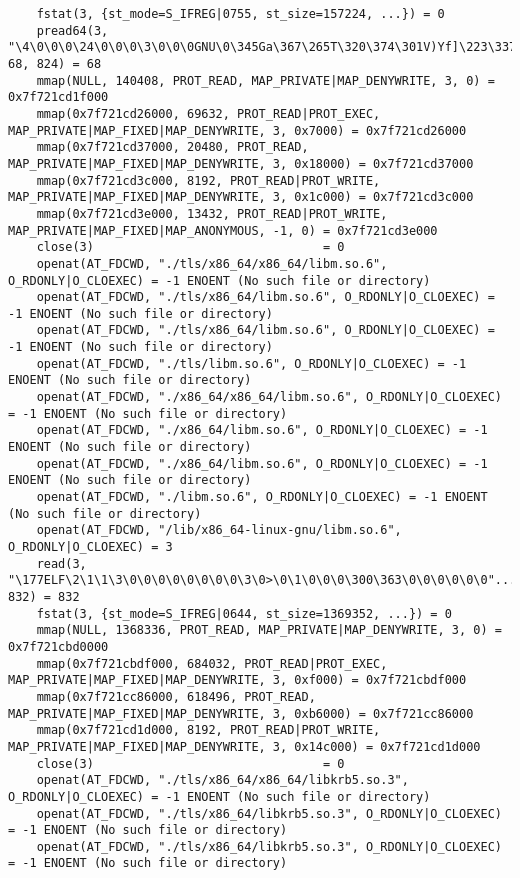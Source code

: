 \documentclass[pdf, unicode, 12pt, a4paper,oneside,fleqn]{article}
\begin{document}
{\begin{verbatim}
    fstat(3, {st_mode=S_IFREG|0755, st_size=157224, ...}) = 0
    pread64(3, "\4\0\0\0\24\0\0\0\3\0\0\0GNU\0\345Ga\367\265T\320\374\301V)Yf]\223\337"..., 68, 824) = 68
    mmap(NULL, 140408, PROT_READ, MAP_PRIVATE|MAP_DENYWRITE, 3, 0) = 0x7f721cd1f000
    mmap(0x7f721cd26000, 69632, PROT_READ|PROT_EXEC, MAP_PRIVATE|MAP_FIXED|MAP_DENYWRITE, 3, 0x7000) = 0x7f721cd26000
    mmap(0x7f721cd37000, 20480, PROT_READ, MAP_PRIVATE|MAP_FIXED|MAP_DENYWRITE, 3, 0x18000) = 0x7f721cd37000
    mmap(0x7f721cd3c000, 8192, PROT_READ|PROT_WRITE, MAP_PRIVATE|MAP_FIXED|MAP_DENYWRITE, 3, 0x1c000) = 0x7f721cd3c000
    mmap(0x7f721cd3e000, 13432, PROT_READ|PROT_WRITE, MAP_PRIVATE|MAP_FIXED|MAP_ANONYMOUS, -1, 0) = 0x7f721cd3e000
    close(3)                                = 0
    openat(AT_FDCWD, "./tls/x86_64/x86_64/libm.so.6", O_RDONLY|O_CLOEXEC) = -1 ENOENT (No such file or directory)
    openat(AT_FDCWD, "./tls/x86_64/libm.so.6", O_RDONLY|O_CLOEXEC) = -1 ENOENT (No such file or directory)
    openat(AT_FDCWD, "./tls/x86_64/libm.so.6", O_RDONLY|O_CLOEXEC) = -1 ENOENT (No such file or directory)
    openat(AT_FDCWD, "./tls/libm.so.6", O_RDONLY|O_CLOEXEC) = -1 ENOENT (No such file or directory)
    openat(AT_FDCWD, "./x86_64/x86_64/libm.so.6", O_RDONLY|O_CLOEXEC) = -1 ENOENT (No such file or directory)
    openat(AT_FDCWD, "./x86_64/libm.so.6", O_RDONLY|O_CLOEXEC) = -1 ENOENT (No such file or directory)
    openat(AT_FDCWD, "./x86_64/libm.so.6", O_RDONLY|O_CLOEXEC) = -1 ENOENT (No such file or directory)
    openat(AT_FDCWD, "./libm.so.6", O_RDONLY|O_CLOEXEC) = -1 ENOENT (No such file or directory)
    openat(AT_FDCWD, "/lib/x86_64-linux-gnu/libm.so.6", O_RDONLY|O_CLOEXEC) = 3
    read(3, "\177ELF\2\1\1\3\0\0\0\0\0\0\0\0\3\0>\0\1\0\0\0\300\363\0\0\0\0\0\0"..., 832) = 832
    fstat(3, {st_mode=S_IFREG|0644, st_size=1369352, ...}) = 0
    mmap(NULL, 1368336, PROT_READ, MAP_PRIVATE|MAP_DENYWRITE, 3, 0) = 0x7f721cbd0000
    mmap(0x7f721cbdf000, 684032, PROT_READ|PROT_EXEC, MAP_PRIVATE|MAP_FIXED|MAP_DENYWRITE, 3, 0xf000) = 0x7f721cbdf000
    mmap(0x7f721cc86000, 618496, PROT_READ, MAP_PRIVATE|MAP_FIXED|MAP_DENYWRITE, 3, 0xb6000) = 0x7f721cc86000
    mmap(0x7f721cd1d000, 8192, PROT_READ|PROT_WRITE, MAP_PRIVATE|MAP_FIXED|MAP_DENYWRITE, 3, 0x14c000) = 0x7f721cd1d000
    close(3)                                = 0
    openat(AT_FDCWD, "./tls/x86_64/x86_64/libkrb5.so.3", O_RDONLY|O_CLOEXEC) = -1 ENOENT (No such file or directory)
    openat(AT_FDCWD, "./tls/x86_64/libkrb5.so.3", O_RDONLY|O_CLOEXEC) = -1 ENOENT (No such file or directory)
    openat(AT_FDCWD, "./tls/x86_64/libkrb5.so.3", O_RDONLY|O_CLOEXEC) = -1 ENOENT (No such file or directory)

\end{verbatim}}
\end{document}
